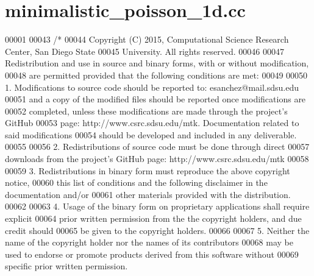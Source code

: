 \hypertarget{minimalistic__poisson__1d_8cc_source}{\section{minimalistic\+\_\+poisson\+\_\+1d.\+cc}
\label{minimalistic__poisson__1d_8cc_source}
}

\begin{DoxyCode}
00001 
00043 \textcolor{comment}{/*}
00044 \textcolor{comment}{Copyright (C) 2015, Computational Science Research Center, San Diego State}
00045 \textcolor{comment}{University. All rights reserved.}
00046 \textcolor{comment}{}
00047 \textcolor{comment}{Redistribution and use in source and binary forms, with or without modification,}
00048 \textcolor{comment}{are permitted provided that the following conditions are met:}
00049 \textcolor{comment}{}
00050 \textcolor{comment}{1. Modifications to source code should be reported to: esanchez@mail.sdsu.edu}
00051 \textcolor{comment}{and a copy of the modified files should be reported once modifications are}
00052 \textcolor{comment}{completed, unless these modifications are made through the project's GitHub}
00053 \textcolor{comment}{page: http://www.csrc.sdsu.edu/mtk. Documentation related to said modifications}
00054 \textcolor{comment}{should be developed and included in any deliverable.}
00055 \textcolor{comment}{}
00056 \textcolor{comment}{2. Redistributions of source code must be done through direct}
00057 \textcolor{comment}{downloads from the project's GitHub page: http://www.csrc.sdsu.edu/mtk}
00058 \textcolor{comment}{}
00059 \textcolor{comment}{3. Redistributions in binary form must reproduce the above copyright notice,}
00060 \textcolor{comment}{this list of conditions and the following disclaimer in the documentation and/or}
00061 \textcolor{comment}{other materials provided with the distribution.}
00062 \textcolor{comment}{}
00063 \textcolor{comment}{4. Usage of the binary form on proprietary applications shall require explicit}
00064 \textcolor{comment}{prior written permission from the the copyright holders, and due credit should}
00065 \textcolor{comment}{be given to the copyright holders.}
00066 \textcolor{comment}{}
00067 \textcolor{comment}{5. Neither the name of the copyright holder nor the names of its contributors}
00068 \textcolor{comment}{may be used to endorse or promote products derived from this software without}
00069 \textcolor{comment}{specific prior written permission.}

\end{DoxyCode}
